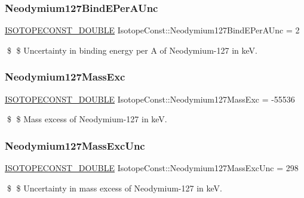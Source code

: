 \subsubsection{\texorpdfstring{Neodymium127\+Bind\+E\+Per\+A\+Unc}{Neodymium127BindEPerAUnc}}
{\footnotesize\ttfamily \mbox{\hyperlink{group___isotope_const-_macros_ga8f45a7272ce02c0b4c65c44636ed719a}{I\+S\+O\+T\+O\+P\+E\+C\+O\+N\+S\+T\+\_\+\+D\+O\+U\+B\+LE}} Isotope\+Const\+::\+Neodymium127\+Bind\+E\+Per\+A\+Unc = 2}

\$ \$ Uncertainty in binding energy per A of Neodymium-\/127 in keV. \mbox{\label{group___isotope_const-_neodymium-_nd127_ga09b6b737398bc7596dd5a220c6926e35}} 
\subsubsection{\texorpdfstring{Neodymium127\+Mass\+Exc}{Neodymium127MassExc}}
{\footnotesize\ttfamily \mbox{\hyperlink{group___isotope_const-_macros_ga8f45a7272ce02c0b4c65c44636ed719a}{I\+S\+O\+T\+O\+P\+E\+C\+O\+N\+S\+T\+\_\+\+D\+O\+U\+B\+LE}} Isotope\+Const\+::\+Neodymium127\+Mass\+Exc = -\/55536}

\$ \$ Mass excess of Neodymium-\/127 in keV. \mbox{\label{group___isotope_const-_neodymium-_nd127_ga5fc08266103206c92b88d24b04c71372}} 
\subsubsection{\texorpdfstring{Neodymium127\+Mass\+Exc\+Unc}{Neodymium127MassExcUnc}}
{\footnotesize\ttfamily \mbox{\hyperlink{group___isotope_const-_macros_ga8f45a7272ce02c0b4c65c44636ed719a}{I\+S\+O\+T\+O\+P\+E\+C\+O\+N\+S\+T\+\_\+\+D\+O\+U\+B\+LE}} Isotope\+Const\+::\+Neodymium127\+Mass\+Exc\+Unc = 298}

\$ \$ Uncertainty in mass excess of Neodymium-\/127 in keV. \mbox{\label{group___isotope_const-_neodymium-_nd127_ga7dcfe752253bf783058743675d75fab5}} 
